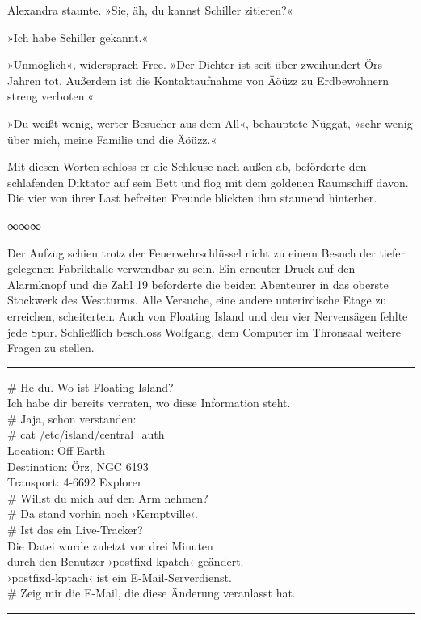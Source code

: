 Alexandra staunte. »Sie, äh, du kannst Schiller zitieren?«

»Ich habe Schiller gekannt.«

»Unmöglich«, widersprach Free. »Der Dichter ist seit über zweihundert Örs-Jahren tot. Außerdem ist die Kontaktaufnahme von Äöüzz zu Erdbewohnern streng verboten.«

»Du weißt wenig, werter Besucher aus dem All«, behauptete Nüggät, »sehr wenig über mich, meine Familie und die Äöüzz.«

Mit diesen Worten schloss er die Schleuse nach außen ab, beförderte den schlafenden Diktator auf sein Bett und flog mit dem goldenen Raumschiff davon. Die vier von ihrer Last befreiten Freunde blickten ihm staunend hinterher.

\begin{center}
∞∞∞
\end{center}

Der Aufzug schien trotz der Feuerwehrschlüssel nicht zu einem Besuch der tiefer gelegenen Fabrikhalle verwendbar zu sein. Ein erneuter Druck auf den Alarmknopf und die Zahl 19 beförderte die beiden Abenteurer in das oberste Stockwerk des Westturms. Alle Versuche, eine andere unterirdische Etage zu erreichen, scheiterten. Auch von Floating Island und den vier Nervensägen fehlte jede Spur. Schließlich beschloss Wolfgang, dem Computer im Thronsaal weitere Fragen zu stellen.

\noindent \parbox{\textwidth}{ \vspace{3ex} \hrule \vspace{3ex}

    \begin{tiny}
    \begin{ttfamily}

\noindent \# He du. Wo ist Floating Island?\\
\noindent Ich habe dir bereits verraten, wo diese Information steht.\\
\noindent \# Jaja, schon verstanden:\\
\noindent \# cat /etc/island/central\_auth\\
\noindent Location: Off-Earth\\
\noindent Destination: Örz, NGC 6193\\
\noindent Transport: 4-6692 Explorer\\
\noindent \# Willst du mich auf den Arm nehmen?\\
\noindent \# Da stand vorhin noch ›Kemptville‹.\\
\noindent \# Ist das ein Live-Tracker?\\
\noindent Die Datei wurde zuletzt vor drei Minuten\\
\noindent durch den Benutzer ›postfixd-kpatch‹ geändert.\\
\noindent ›postfixd-kptach‹ ist ein E-Mail-Serverdienst.\\
\noindent \# Zeig mir die E-Mail, die diese Änderung veranlasst hat.

    \end{ttfamily}
    \end{tiny}

\vspace{3ex} \hrule \vspace{3ex} }

